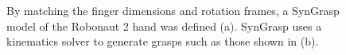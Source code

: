 \documentclass[runningheads,a4paper]{llncs}
\begin{document}
\begin{figure}[t]%
\centering
\null\hfill
	\hfill
	\hfill\null

\caption{By matching the finger dimensions and rotation frames, a SynGrasp model of the Robonaut 2 hand was defined (a).  SynGrasp uses a kinematics solver to generate grasps such as those shown in (b). }%
\label{fig:models}%
\end{figure} 
\end{document}
